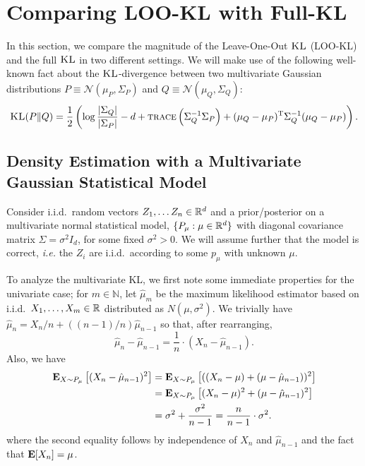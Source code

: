 \documentclass{article}
\renewcommand{\cN}{\mathscr{N}}
\begin{document}
\section{Comparing LOO-KL with Full-KL}
In this section, we compare the magnitude of the Leave-One-Out $\text{\sc KL}$ (LOO-KL) and the full $\text{\sc KL}$ in two different settings. We will make use of the following well-known fact about the $\text{\sc KL}$-divergence between two multivariate Gaussian distributions $P \equiv \cN(\mu_P, \Sigma_P)$ and $Q\equiv \cN(\mu_Q, \Sigma_Q)$:
\begin{align}
\text{\sc KL}(P \| Q) = \frac{1}{2} \left(\log \frac{| \Sigma_Q |}{|\Sigma_P|} - d + \text{\sc trace}\left( \Sigma_Q^{-1} \Sigma_P \right)    + (\mu_Q-\mu_P)^{{\text{\sc T}}} \Sigma_Q^{-1} (\mu_Q - \mu_P) \right). \label{eq:KLexpress}
\end{align}
 \subsection{Density Estimation with a Multivariate Gaussian Statistical Model}
Consider i.i.d.~random vectors $Z_1, \ldots Z_n \in {\mathbb R}^d$ and a prior/posterior on a multivariate normal
statistical model, $\{P_{\mu} : \mu \in {\mathbb R}^d \}$ with diagonal
covariance matrix $\Sigma = \sigma^2 {I}_d$, for some fixed $\sigma^2 > 0$. We will assume further that the model is correct, \emph{i.e.} the $Z_i$ are i.i.d.~according to some $p_{\mu}$ with unknown $\mu$.


To analyze the multivariate KL, we first note some immediate properties for the univariate case; for $m \in \mathbb{N}$, let $\hat{\mu}_m$ be the maximum likelihood estimator based on i.i.d.~$X_1, \ldots, X_m\in {\mathbb R}$ distributed as $N(\mu,\sigma^2)$. 
We trivially have  $\hat{\mu}_{n} = X_{n}/n + ((n-1)/n) \hat{\mu}_{n-1}$ so that, after rearranging,
\begin{equation}\label{eq:mlebasics0}
\hat{\mu}_n - \hat{\mu}_{n-1} = \frac{1}{n} \cdot \left( X_n -  \hat{\mu}_{n-1}\right).
\end{equation}  
Also, we have
\begin{align}\label{eq:mleadvanced0}
{\bf E}_{X \sim P_{\mu}}\left[(X_n - \hat{\mu}_{n-1})^2\right]
& =
{\bf E}_{X \sim P_{\mu}}\left[((X_n - \mu) + (\mu - \hat{\mu}_{n-1}))^2\right] 
\nonumber\\ & =  {\bf E}_{X \sim P_{\mu}}\left[(X_n - \mu)^2 + (\mu - \hat{\mu}_{n-1})^2\right]
\\ &= \sigma^2 + \frac{\sigma^2}{n-1} = \frac{n}{n-1} \cdot \sigma^2.
\end{align}
where the second equality follows by independence of $X_n$ and $\hat{\mu}_{n-1}$ and the fact that ${\bf E}[X_n] = \mu$. 
\end{document}

